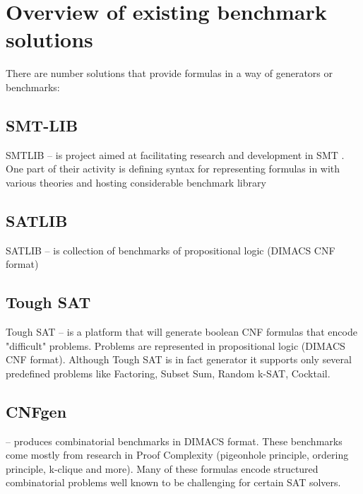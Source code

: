 \chapter{Overview of existing benchmark solutions}

There are number solutions that provide formulas in a way of generators or benchmarks:

\section{SMT-LIB}
\label{sec:SMTLIBBenchmarks}

SMTLIB \cite{BarFT-RR-17} -- is project aimed at facilitating research and development in \gls{SMT} . One part of their activity is defining syntax for representing formulas in with various theories and hosting considerable benchmark library

\section{SATLIB}

SATLIB \cite{Hol00} -- is collection of benchmarks of propositional logic (DIMACS CNF format)

\section{Tough SAT}

Tough SAT \cite{ToughSAT} -- is a platform that will generate boolean CNF formulas that encode "difficult" problems. Problems are represented in propositional logic (DIMACS CNF format). Although Tough SAT is in fact generator it supports only several predefined problems like Factoring, Subset Sum, Random k-SAT, Cocktail.

\section{CNFgen}

\cite{CNFGen} -- produces combinatorial benchmarks in DIMACS format. These benchmarks come mostly from research in Proof Complexity (pigeonhole principle, ordering principle, k-clique and more). Many of these formulas encode structured combinatorial problems well known to be challenging for certain SAT solvers.


